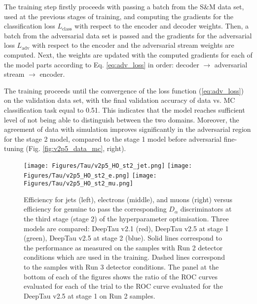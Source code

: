 The training step firstly proceeds with passing a batch from the S\&M data set, used at the previous stages of training, and computing the gradients for the classification loss $L_\text{class}$ with respect to the encoder and decoder weights. Then, a batch from the adversarial data set is passed and the gradients for the adversarial loss $L_\text{adv}$ with respect to the encoder and the adversarial stream weights are computed. Next, the weights are updated with the computed gradients for each of the model parts according to Eq. \ref{eq:adv_loss} in order: decoder $\to$ adversarial stream $\to$ encoder. 

The training proceeds until the convergence of the loss function (\ref{eq:adv_loss}) on the validation data set, with the final validation accuracy of data vs. MC classification task equal to 0.51. This indicates that the model reaches sufficient level of not being able to distinguish between the two domains. Moreover, the agreement of data with simulation improves significantly in the adversarial region for the stage 2 model, compared to the stage 1 model before adversarial fine-tuning (Fig. \ref{fig:v2p5_data_mc}, right). 

\begin{figure}[t!]
    \centering
    \texttt{[image: Figures/Tau/v2p5\_HO\_st2\_jet.png]}
    \texttt{[image: Figures/Tau/v2p5\_HO\_st2\_e.png]}
    \texttt{[image: Figures/Tau/v2p5\_HO\_st2\_mu.png]}
    \caption{Efficiency for jets (left), electrons (middle), and muons (right) versus efficiency for genuine \tauh to pass the corresponding $D_\alpha$ discriminators at the third stage (stage 2) of the hyperparameter optimisation. Three models are compared: DeepTau v2.1 (red), DeepTau v2.5 at stage 1 (green), DeepTau v2.5 at stage 2 (blue). Solid lines correspond to the performance as measured on the samples with Run 2 detector conditions which are used in the training. Dashed lines correspond to the samples with Run 3 detector conditions. The panel at the bottom of each of the figures shows the ratio of the ROC curves evaluated for each of the trial to the ROC curve evaluated for the DeepTau v2.5 at stage 1 on Run 2 samples.}
    \label{fig:v2p5_HO_stage2_performance}
\end{figure}

